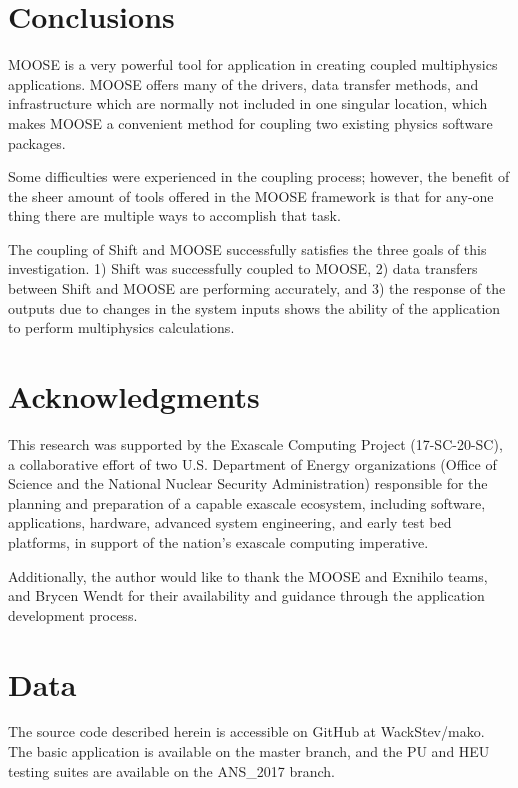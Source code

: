 \documentclass{anstrans}
\begin{document}
\section{Conclusions}
MOOSE is a very powerful tool for application in creating coupled multiphysics applications. MOOSE offers many of the drivers, data transfer methods, and infrastructure which are normally not included in one singular location, which makes MOOSE a convenient method for coupling two existing physics software packages. 

Some difficulties were experienced in the coupling process; however, the benefit of the sheer amount of tools offered in the MOOSE framework is that for any-one thing there are multiple ways to accomplish that task.

The coupling of Shift and MOOSE successfully satisfies the three goals of this investigation. 1) Shift was successfully coupled to MOOSE, 2) data transfers between Shift and MOOSE are performing accurately, and 3) the response of the outputs due to changes in the system inputs shows the ability of the application to perform multiphysics calculations. 
\section{Acknowledgments}

This research was supported by the Exascale Computing Project (17-SC-20-SC), a collaborative effort of two U.S. Department of Energy organizations (Office of Science and the National Nuclear Security Administration) responsible for the planning and preparation of a capable exascale ecosystem, including software, applications, hardware, advanced system engineering, and early test bed platforms, in support of the nation's exascale computing imperative.

Additionally, the author would like to thank the MOOSE and Exnihilo teams, and Brycen Wendt for their availability and guidance through the application development process.

\appendix
\section{Data}
The source code described herein is accessible on GitHub at WackStev/mako. The basic application is available on the master branch, and the PU and HEU testing suites are available on the ANS\_2017 branch. 



\end{document}
